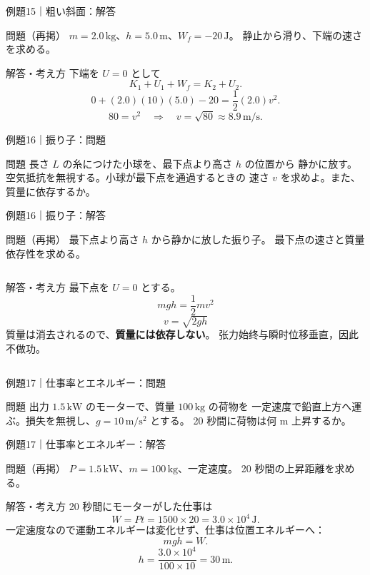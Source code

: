 \documentclass[notheorems,aspectratio=169]{beamer}
\newcommand{\key}[1]{\textbf{\color{ChinaRed}#1}}
\newcommand{\qcard}[1]{%
  \begin{block}{問題}\centering\large #1\end{block}}
\newcommand{\qsmall}[1]{%
  \begin{block}{問題（再掲）}\small #1\end{block}}
\newcommand{\acard}[1]{%
  \begin{exampleblock}{解答・考え方}#1\end{exampleblock}}
\begin{document}
\begin{frame}{例題15｜粗い斜面：解答}
  \qsmall{
    $m=2.0\,\mathrm{kg}$、$h=5.0\,\mathrm m$、$W_f=-20\,\mathrm J$。
    静止から滑り、下端の速さを求める。
  }
  \acard{
    下端を $U=0$ として
    \[
      K_1+U_1+W_f=K_2+U_2.
    \]
    \[
      0+(2.0)(10)(5.0)-20
      =\frac12(2.0)v^2.
    \]
    \[
      80=v^2
      \quad\Rightarrow\quad
      v=\sqrt{80}\approx\boxed{8.9\,\mathrm{m/s}}.
    \]
  }
\end{frame}

\begin{frame}{例題16｜振り子：問題}
  \vfill
  \qcard{
    長さ $L$ の糸につけた小球を、最下点より高さ $h$ の位置から
    静かに放す。空気抵抗を無視する。小球が最下点を通過するときの
    速さ $v$ を求めよ。また、質量に依存するか。
  }
  \vfill
\end{frame}

\begin{frame}{例題16｜振り子：解答}
  \qsmall{
    最下点より高さ $h$ から静かに放した振り子。
    最下点の速さと質量依存性を求める。
  }
  \begin{columns}[T,onlytextwidth]
    \centering
    \acard{
      最下点を $U=0$ とする。
      \[
        mgh=\frac12mv^2
      \]
      \[
        \boxed{v=\sqrt{2gh}}
      \]
      質量は消去されるので、\key{質量には依存しない}。
      张力始终与瞬时位移垂直，因此不做功。
    }
  \end{columns}
\end{frame}

\begin{frame}{例題17｜仕事率とエネルギー：問題}
  \vfill
  \qcard{
    出力 $1.5\,\mathrm{kW}$ のモーターで、質量 $100\,\mathrm{kg}$ の荷物を
    一定速度で鉛直上方へ運ぶ。損失を無視し、$g=10\,\mathrm{m/s^2}$ とする。
    20 秒間に荷物は何 m 上昇するか。
  }
  \vfill
\end{frame}

\begin{frame}{例題17｜仕事率とエネルギー：解答}
  \qsmall{
    $P=1.5\,\mathrm{kW}$、$m=100\,\mathrm{kg}$、一定速度。
    20 秒間の上昇距離を求める。
  }
  \acard{
    20 秒間にモーターがした仕事は
    \[
      W=Pt=1500\times20=3.0\times10^4\,\mathrm J.
    \]
    一定速度なので運動エネルギーは変化せず、仕事は位置エネルギーへ：
    \[
      mgh=W.
    \]
    \[
      h=\frac{3.0\times10^4}{100\times10}
      =\boxed{30\,\mathrm m}.
    \]
  }
\end{frame}
\end{document}
